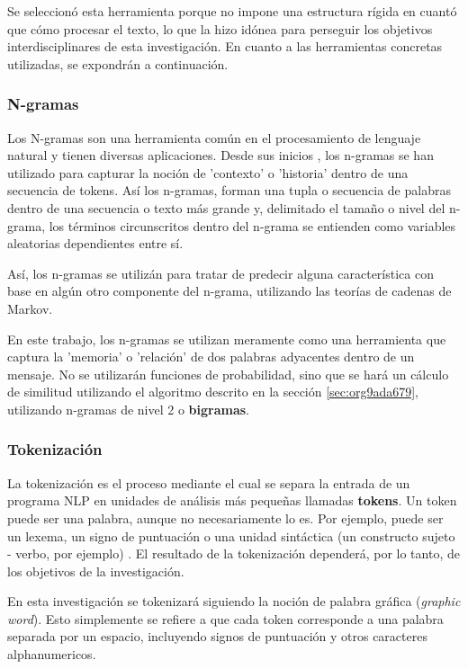 \documentclass[12pt,letterpaper,twoside]{article}
\begin{document}
Se seleccionó esta herramienta porque no impone una estructura
rígida en cuantó que cómo procesar el texto, lo que la hizo
idónea para perseguir los objetivos interdisciplinares de esta
investigación. En cuanto a las herramientas concretas utilizadas,
se expondrán a continuación.

\subsubsection{N-gramas}
\label{sec:org18adeee}

Los N-gramas son una herramienta común en el procesamiento
de lenguaje natural y tienen diversas aplicaciones. Desde sus
inicios \cite{manning1999foundations}, los n-gramas se han
utilizado para capturar la noción de 'contexto' o 'historia'
dentro de una secuencia de tokens. Así los n-gramas, forman
una tupla o secuencia de palabras dentro de una secuencia
o texto más grande y, delimitado el tamaño o nivel del
n-grama, los términos circunscritos dentro del n-grama
se entienden como variables aleatorias dependientes entre sí.

Así, los n-gramas se utilizán para tratar de predecir alguna
característica con base en algún otro componente del n-grama,
utilizando las teorías de cadenas de Markov.

En este trabajo, los n-gramas se utilizan meramente
como una herramienta que captura la 'memoria' o 'relación'
de dos palabras adyacentes dentro de un mensaje. No se
utilizarán funciones de probabilidad, sino que se hará
un cálculo de similitud utilizando el algoritmo descrito
en la sección  \ref{sec:org9ada679}, utilizando
n-gramas de nivel 2 o \textbf{bigramas}.


\subsubsection{Tokenización}
\label{sec:org95dffa8}
La tokenización es el proceso mediante el cual se separa la entrada
de un programa NLP en unidades de análisis más pequeñas llamadas
\textbf{tokens}. Un token puede ser una palabra, aunque no necesariamente
lo es. Por ejemplo, puede ser un lexema, un signo de puntuación
o una unidad sintáctica (un constructo sujeto - verbo, por ejemplo)
\cite{manning1999foundations}. El resultado de la tokenización
dependerá, por lo tanto, de los objetivos de la investigación.

En esta investigación se tokenizará siguiendo la noción de
palabra gráfica (\emph{graphic word}). Esto simplemente se refiere
a que cada token corresponde a una palabra separada por un espacio,
incluyendo signos de puntuación y otros caracteres alphanumericos.
\end{document}
